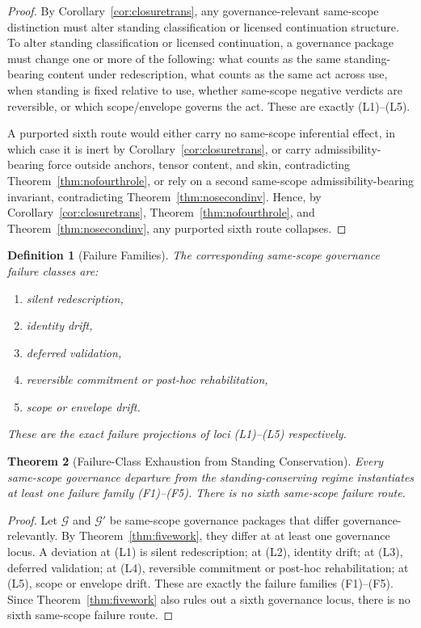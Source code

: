 \documentclass[11pt]{article}
\newtheorem{theorem}{Theorem}[section]
\newtheorem{definition}[theorem]{Definition}
\begin{document}
\begin{proof}
By Corollary~\ref{cor:closuretrans}, any governance-relevant same-scope distinction must alter standing classification or licensed continuation structure. To alter standing classification or licensed continuation, a governance package must change one or more of the following: what counts as the same standing-bearing content under redescription, what counts as the same act across use, when standing is fixed relative to use, whether same-scope negative verdicts are reversible, or which scope/envelope governs the act. These are exactly \textup{(L1)}--\textup{(L5)}.

A purported sixth route would either carry no same-scope inferential effect, in which case it is inert by Corollary~\ref{cor:closuretrans}, or carry admissibility-bearing force outside anchors, tensor content, and skin, contradicting Theorem~\ref{thm:nofourthrole}, or rely on a second same-scope admissibility-bearing invariant, contradicting Theorem~\ref{thm:nosecondinv}. Hence, by Corollary~\ref{cor:closuretrans}, Theorem~\ref{thm:nofourthrole}, and Theorem~\ref{thm:nosecondinv}, any purported sixth route collapses.
\end{proof}

\begin{definition}[Failure Families]
\label{def:failfam}
The corresponding same-scope governance failure classes are:
\begin{enumerate}
\item[(F1)] \emph{silent redescription},
\item[(F2)] \emph{identity drift},
\item[(F3)] \emph{deferred validation},
\item[(F4)] \emph{reversible commitment or post-hoc rehabilitation},
\item[(F5)] \emph{scope or envelope drift}.
\end{enumerate}
These are the exact failure projections of loci \textup{(L1)}--\textup{(L5)} respectively.
\end{definition}

\begin{theorem}[Failure-Class Exhaustion from Standing Conservation]
\label{thm:exhaust}
Every same-scope governance departure from the standing-conserving regime instantiates at least one failure family \textup{(F1)}--\textup{(F5)}. There is no sixth same-scope failure route.
\end{theorem}

\begin{proof}
Let $\mathcal{G}$ and $\mathcal{G}'$ be same-scope governance packages that differ governance-relevantly. By Theorem~\ref{thm:fivework}, they differ at at least one governance locus. A deviation at \textup{(L1)} is silent redescription; at \textup{(L2)}, identity drift; at \textup{(L3)}, deferred validation; at \textup{(L4)}, reversible commitment or post-hoc rehabilitation; at \textup{(L5)}, scope or envelope drift. These are exactly the failure families \textup{(F1)}--\textup{(F5)}. Since Theorem~\ref{thm:fivework} also rules out a sixth governance locus, there is no sixth same-scope failure route.
\end{proof}
\end{document}
